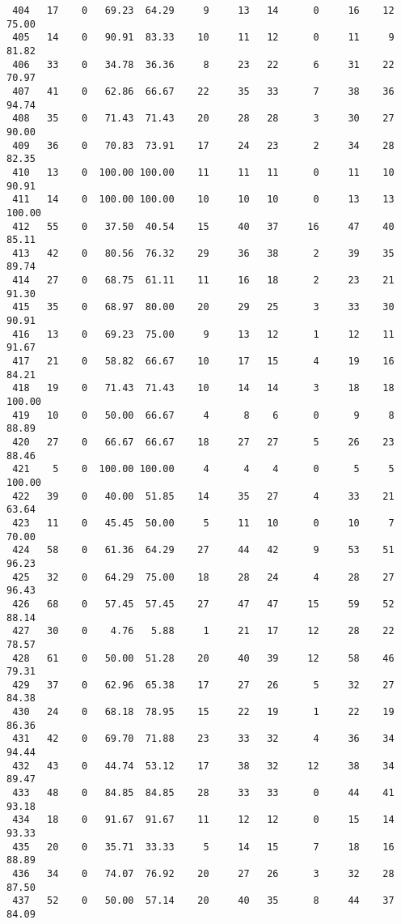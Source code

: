 \begin{verbatim}
 404   17    0   69.23  64.29     9     13   14      0     16    12    75.00
 405   14    0   90.91  83.33    10     11   12      0     11     9    81.82
 406   33    0   34.78  36.36     8     23   22      6     31    22    70.97
 407   41    0   62.86  66.67    22     35   33      7     38    36    94.74
 408   35    0   71.43  71.43    20     28   28      3     30    27    90.00
 409   36    0   70.83  73.91    17     24   23      2     34    28    82.35
 410   13    0  100.00 100.00    11     11   11      0     11    10    90.91
 411   14    0  100.00 100.00    10     10   10      0     13    13   100.00
 412   55    0   37.50  40.54    15     40   37     16     47    40    85.11
 413   42    0   80.56  76.32    29     36   38      2     39    35    89.74
 414   27    0   68.75  61.11    11     16   18      2     23    21    91.30
 415   35    0   68.97  80.00    20     29   25      3     33    30    90.91
 416   13    0   69.23  75.00     9     13   12      1     12    11    91.67
 417   21    0   58.82  66.67    10     17   15      4     19    16    84.21
 418   19    0   71.43  71.43    10     14   14      3     18    18   100.00
 419   10    0   50.00  66.67     4      8    6      0      9     8    88.89
 420   27    0   66.67  66.67    18     27   27      5     26    23    88.46
 421    5    0  100.00 100.00     4      4    4      0      5     5   100.00
 422   39    0   40.00  51.85    14     35   27      4     33    21    63.64
 423   11    0   45.45  50.00     5     11   10      0     10     7    70.00
 424   58    0   61.36  64.29    27     44   42      9     53    51    96.23
 425   32    0   64.29  75.00    18     28   24      4     28    27    96.43
 426   68    0   57.45  57.45    27     47   47     15     59    52    88.14
 427   30    0    4.76   5.88     1     21   17     12     28    22    78.57
 428   61    0   50.00  51.28    20     40   39     12     58    46    79.31
 429   37    0   62.96  65.38    17     27   26      5     32    27    84.38
 430   24    0   68.18  78.95    15     22   19      1     22    19    86.36
 431   42    0   69.70  71.88    23     33   32      4     36    34    94.44
 432   43    0   44.74  53.12    17     38   32     12     38    34    89.47
 433   48    0   84.85  84.85    28     33   33      0     44    41    93.18
 434   18    0   91.67  91.67    11     12   12      0     15    14    93.33
 435   20    0   35.71  33.33     5     14   15      7     18    16    88.89
 436   34    0   74.07  76.92    20     27   26      3     32    28    87.50
 437   52    0   50.00  57.14    20     40   35      8     44    37    84.09

\end{verbatim}
